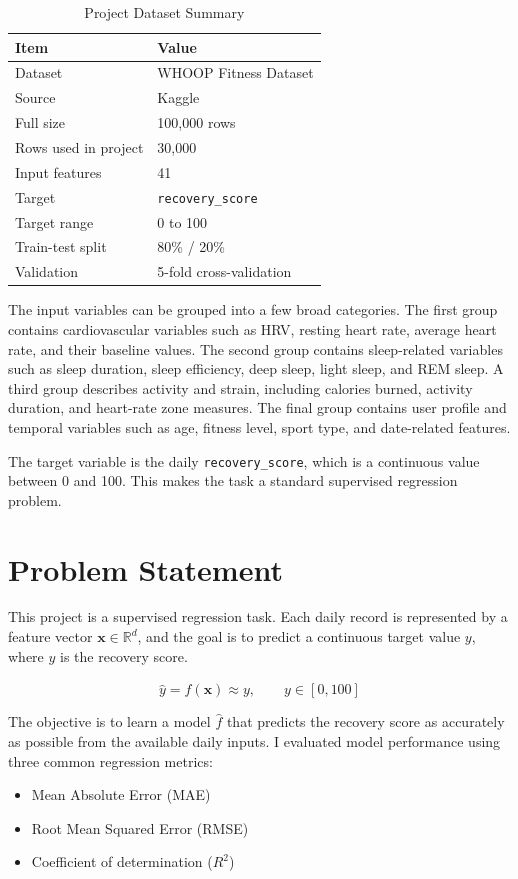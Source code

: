 \documentclass[conference]{IEEEtran}
\newcommand{\Rsq}{$R^{2}$}
\begin{document}
\begin{table}[htbp]
\caption{Project Dataset Summary}
\label{tab:data_summary}
\centering
\begin{tabular}{ll}
\toprule
\textbf{Item} & \textbf{Value} \\
\midrule
Dataset & WHOOP Fitness Dataset \\
Source & Kaggle \\
Full size & 100{,}000 rows \\
Rows used in project & 30{,}000 \\
Input features & 41 \\
Target & \texttt{recovery\_score} \\
Target range & 0 to 100 \\
Train-test split & 80\% / 20\% \\
Validation & 5-fold cross-validation \\
\bottomrule
\end{tabular}
\end{table}

The input variables can be grouped into a few broad categories. The first group contains cardiovascular variables such as HRV, resting heart rate, average heart rate, and their baseline values. The second group contains sleep-related variables such as sleep duration, sleep efficiency, deep sleep, light sleep, and REM sleep. A third group describes activity and strain, including calories burned, activity duration, and heart-rate zone measures. The final group contains user profile and temporal variables such as age, fitness level, sport type, and date-related features.

The target variable is the daily \texttt{recovery\_score}, which is a continuous value between 0 and 100. This makes the task a standard supervised regression problem.

\section{Problem Statement}
This project is a supervised regression task. Each daily record is represented by a feature vector $\mathbf{x} \in \mathbb{R}^{d}$, and the goal is to predict a continuous target value $y$, where $y$ is the recovery score.

\begin{equation}
\hat{y} = \hat{f}(\mathbf{x}) \approx y, \qquad y \in [0,100]
\end{equation}

The objective is to learn a model $\hat{f}$ that predicts the recovery score as accurately as possible from the available daily inputs. I evaluated model performance using three common regression metrics:
\begin{itemize}
  \item Mean Absolute Error (MAE)
  \item Root Mean Squared Error (RMSE)
  \item Coefficient of determination (\Rsq{})
\end{itemize}
\end{document}
